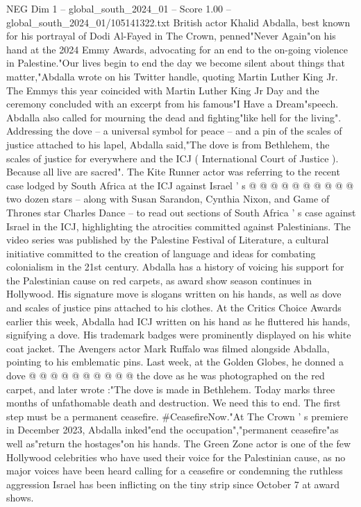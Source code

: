 \begin{textsample}{NEG Dim 1 – global\_south\_2024\_01 – Score 1.00 – global\_south\_2024\_01/105141322.txt}  \label{ex:f1_neg_330}
British actor Khalid Abdalla, best known for his portrayal of Dodi Al-Fayed in The Crown, penned"Never Again"on his hand at the 2024 Emmy Awards, advocating for an end to the on-going violence in Palestine."Our lives begin to end the day we become silent about things that matter,"Abdalla wrote on his Twitter handle, quoting Martin Luther King Jr.
The Emmys this year coincided with Martin Luther King Jr Day and the ceremony concluded with an excerpt from his famous"I Have a Dream"speech.
Abdalla also called for mourning the dead and fighting"like hell for the living".
Addressing the dove -- a universal symbol for peace -- and a pin of the scales of justice attached to his lapel, Abdalla said,"The dove is from Bethlehem, the scales of justice for everywhere and the ICJ ( International Court of Justice ).
Because all live are sacred".
The Kite Runner actor was referring to the recent case lodged by South Africa at the ICJ against Israel ' s @ @ @ @ @ @ @ @ @ @ two dozen stars -- along with Susan Sarandon, Cynthia Nixon, and Game of Thrones star Charles Dance -- to read out sections of South Africa ' s case against Israel in the ICJ, highlighting the atrocities committed against Palestinians.
The video series was published by the Palestine Festival of Literature, a cultural initiative committed to the creation of language and ideas for combating colonialism in the 21st century.
Abdalla has a history of voicing his support for the Palestinian cause on red carpets, as award show season continues in Hollywood.
His signature move is slogans written on his hands, as well as dove and scales of justice pins attached to his clothes.
At the Critics Choice Awards earlier this week, Abdalla had ICJ written on his hand as he fluttered his hands, signifying a dove.
His trademark badges were prominently displayed on his white coat jacket.
The Avengers actor Mark Ruffalo was filmed alongside Abdalla, pointing to his emblematic pins.
Last week, at the Golden Globes, he donned a dove @ @ @ @ @ @ @ @ @ @ the dove as he was photographed on the red carpet, and later wrote :"The dove is made in Bethlehem.
Today marks three months of unfathomable death and destruction.
We need this to end.
The first step must be a permanent ceasefire. \#CeasefireNow."At The Crown ' s premiere in December 2023, Abdalla inked"end the occupation","permanent ceasefire"as well as"return the hostages"on his hands.
The Green Zone actor is one of the few Hollywood celebrities who have used their voice for the Palestinian cause, as no major voices have been heard calling for a ceasefire or condemning the ruthless aggression Israel has been inflicting on the tiny strip since October 7 at award shows.

\end{textsample}
